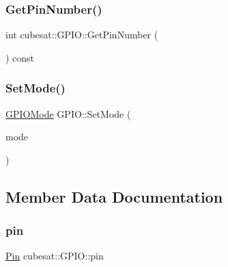 \subsubsection{\texorpdfstring{Get\+Pin\+Number()}{GetPinNumber()}}
{\footnotesize\ttfamily int cubesat\+::\+G\+P\+I\+O\+::\+Get\+Pin\+Number (\begin{DoxyParamCaption}{ }\end{DoxyParamCaption}) const\hspace{0.3cm}{\ttfamily [inline]}}

\mbox{\label{classcubesat_1_1GPIO_a1aacbbd48883285a4730ec7167b1487d}} 
\subsubsection{\texorpdfstring{Set\+Mode()}{SetMode()}}
{\footnotesize\ttfamily \hyperlink{namespacecubesat_a0c9368193169b1a4ca3aa1ba47331abf}{G\+P\+I\+O\+Mode} G\+P\+I\+O\+::\+Set\+Mode (\begin{DoxyParamCaption}\item[{\hyperlink{namespacecubesat_a0c9368193169b1a4ca3aa1ba47331abf}{G\+P\+I\+O\+Mode}}]{mode }\end{DoxyParamCaption})}



\subsection{Member Data Documentation}
\mbox{\label{classcubesat_1_1GPIO_af3e219ff169f027626becf1797a02c50}} 
\subsubsection{\texorpdfstring{pin}{pin}}
{\footnotesize\ttfamily \hyperlink{namespacecubesat_af928ed4b56ef60d75953a91225b37a00}{Pin} cubesat\+::\+G\+P\+I\+O\+::pin\hspace{0.3cm}{\ttfamily [protected]}}

\mbox{\label{classcubesat_1_1GPIO_a799d772718448f641fa2d4a3a18e60ac}} 
